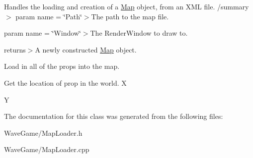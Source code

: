 Handles the loading and creation of a \hyperlink{class_engine_1_1_core_1_1_map}{Map} object, from an X\+ML file. /summary$>$ param name = \char`\"{}\+Path\char`\"{}$>$The path to the map file.

param name = \char`\"{}\+Window\char`\"{}$>$The Render\+Window to draw to.

returns$>$A newly constructed \hyperlink{class_engine_1_1_core_1_1_map}{Map} object.

Load in all of the props into the map.

Get the location of prop in the world. X

Y 

The documentation for this class was generated from the following files\+:\begin{DoxyCompactItemize}
\item 
Wave\+Game/Map\+Loader.\+h\item 
Wave\+Game/Map\+Loader.\+cpp\end{DoxyCompactItemize}
